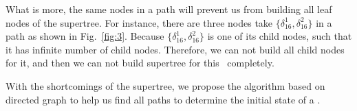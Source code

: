  What is more, the same nodes in a path will prevent us from building all leaf nodes of the supertree. For instance, there are three nodes take $\{\delta_{16}^1,\delta_{16}^2\}$ in a path as shown in Fig.~\ref{fig:3}. Because $\{\delta_{16}^1,\delta_{16}^2\}$ is one of its child nodes, such that it has infinite number of child nodes. Therefore, we can not build all child nodes for it, and then we can not build supertree for this \BCN\ completely.
 
With the shortcomings of the supertree, we propose the algorithm based on directed graph to help us find all paths to determine the initial state of a \BCN.
